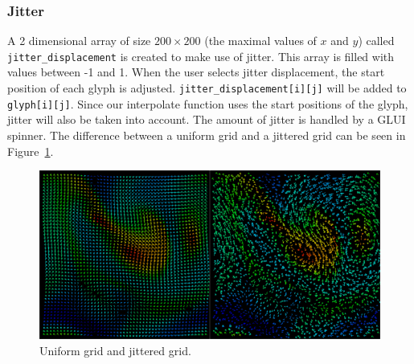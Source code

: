 		\subsubsection{Jitter}
			A 2 dimensional array of size $200 \times 200$ (the maximal values of $x$ and $y$) called \texttt{jitter\_displacement} is created to make use of jitter.
			This array is filled with values between -1 and 1.
			When the user selects jitter displacement, the start position of each glyph is adjusted.
			\texttt{jitter\_displacement[i][j]} will be added to \texttt{glyph[i][j]}.
			Since our interpolate function uses the start positions of the glyph, jitter will also be taken into account.
			The amount of jitter is handled by a GLUI spinner.
			The difference between a uniform grid and a jittered grid can be seen in Figure~\ref{fig:jitter}.
			\begin{figure}[htb]
				\centering
				\includegraphics[width=\linewidth]{./content/pictures/jitter.png}
				\caption{Uniform grid and jittered grid.}
				\label{fig:jitter}
			\end{figure}

